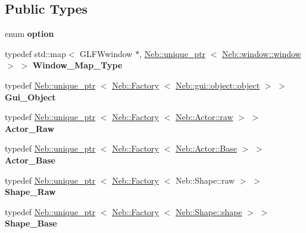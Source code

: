 \subsection*{\-Public \-Types}
\begin{DoxyCompactItemize}
\item 
enum {\bfseries option} 
\item 
\hypertarget{classNeb_1_1master_aeb2db0ac51b05f774e11aa19b9d2ce86}{typedef std\-::map$<$ \-G\-L\-F\-Wwindow \*
$\ast$, \hyperlink{classNeb_1_1unique__ptr}{\-Neb\-::unique\-\_\-ptr}\*
$<$ \hyperlink{classNeb_1_1window_1_1window}{\-Neb\-::window\-::window} $>$ $>$ {\bfseries \-Window\-\_\-\-Map\-\_\-\-Type}}\label{classNeb_1_1master_aeb2db0ac51b05f774e11aa19b9d2ce86}

\item 
\hypertarget{classNeb_1_1master_a1a959eb16f64013e430871c9b8069822}{typedef \hyperlink{classNeb_1_1unique__ptr}{\-Neb\-::unique\-\_\-ptr}\*
$<$ \hyperlink{classNeb_1_1Factory}{\-Neb\-::\-Factory}\*
$<$ \hyperlink{classNeb_1_1gui_1_1object_1_1object}{\-Neb\-::gui\-::object\-::object} $>$ $>$ {\bfseries \-Gui\-\_\-\-Object}}\label{classNeb_1_1master_a1a959eb16f64013e430871c9b8069822}

\item 
\hypertarget{classNeb_1_1master_ac3af757b70b0e360f6edf70403b822c7}{typedef \hyperlink{classNeb_1_1unique__ptr}{\-Neb\-::unique\-\_\-ptr}\*
$<$ \hyperlink{classNeb_1_1Factory}{\-Neb\-::\-Factory}\*
$<$ \hyperlink{classNeb_1_1Actor_1_1raw}{\-Neb\-::\-Actor\-::raw} $>$ $>$ {\bfseries \-Actor\-\_\-\-Raw}}\label{classNeb_1_1master_ac3af757b70b0e360f6edf70403b822c7}

\item 
\hypertarget{classNeb_1_1master_a8dcf02efec834efa24ebb04186809923}{typedef \hyperlink{classNeb_1_1unique__ptr}{\-Neb\-::unique\-\_\-ptr}\*
$<$ \hyperlink{classNeb_1_1Factory}{\-Neb\-::\-Factory}\*
$<$ \hyperlink{classNeb_1_1Actor_1_1Base}{\-Neb\-::\-Actor\-::\-Base} $>$ $>$ {\bfseries \-Actor\-\_\-\-Base}}\label{classNeb_1_1master_a8dcf02efec834efa24ebb04186809923}

\item 
\hypertarget{classNeb_1_1master_ae1769effb020130b1c74917645e0df02}{typedef \hyperlink{classNeb_1_1unique__ptr}{\-Neb\-::unique\-\_\-ptr}\*
$<$ \hyperlink{classNeb_1_1Factory}{\-Neb\-::\-Factory}\*
$<$ \-Neb\-::\-Shape\-::raw $>$ $>$ {\bfseries \-Shape\-\_\-\-Raw}}\label{classNeb_1_1master_ae1769effb020130b1c74917645e0df02}

\item 
\hypertarget{classNeb_1_1master_a5769c0b1668ef16b6641e24535fb6f1b}{typedef \hyperlink{classNeb_1_1unique__ptr}{\-Neb\-::unique\-\_\-ptr}\*
$<$ \hyperlink{classNeb_1_1Factory}{\-Neb\-::\-Factory}\*
$<$ \hyperlink{classNeb_1_1Shape_1_1shape}{\-Neb\-::\-Shape\-::shape} $>$ $>$ {\bfseries \-Shape\-\_\-\-Base}}\label{classNeb_1_1master_a5769c0b1668ef16b6641e24535fb6f1b}

\end{DoxyCompactItemize}
